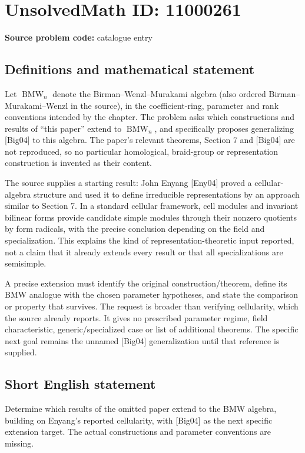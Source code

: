 \documentclass[11pt]{article}
\begin{document}
\section*{UnsolvedMath ID: 11000261}
\textbf{Source problem code:} catalogue entry
\subsection{Definitions and mathematical statement}
Let \(\operatorname{BMW}_n\) denote the Birman--Wenzl--Murakami algebra (also ordered Birman--Murakami--Wenzl in the source), in the coefficient-ring, parameter and rank conventions intended by the chapter. The problem asks which constructions and results of ``this paper'' extend to \(\operatorname{BMW}_n\), and specifically proposes generalizing [Big04] to this algebra. The paper's relevant theorems, Section 7 and [Big04] are not reproduced, so no particular homological, braid-group or representation construction is invented as their content.

The source supplies a starting result: John Enyang [Eny04] proved a cellular-algebra structure and used it to define irreducible representations by an approach similar to Section 7. In a standard cellular framework, cell modules and invariant bilinear forms provide candidate simple modules through their nonzero quotients by form radicals, with the precise conclusion depending on the field and specialization. This explains the kind of representation-theoretic input reported, not a claim that it already extends every result or that all specializations are semisimple.

A precise extension must identify the original construction/theorem, define its BMW analogue with the chosen parameter hypotheses, and state the comparison or property that survives. The request is broader than verifying cellularity, which the source already reports. It gives no prescribed parameter regime, field characteristic, generic/specialized case or list of additional theorems. The specific next goal remains the unnamed [Big04] generalization until that reference is supplied.
\subsection{Short English statement}
Determine which results of the omitted paper extend to the BMW algebra, building on Enyang's reported cellularity, with [Big04] as the next specific extension target. The actual constructions and parameter conventions are missing.
\end{document}
